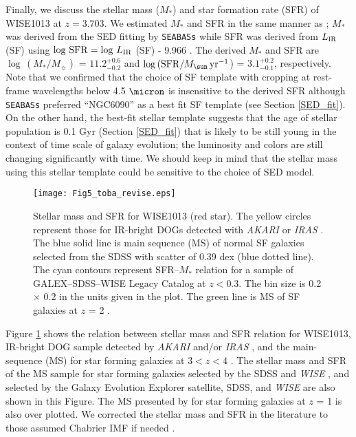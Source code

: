 \documentclass[twocolumn]{aastex6}
\begin{document}
Finally, we discuss the stellar mass ($M_*$) and star formation rate (SFR) of WISE1013 at $z = 3.703$.
We estimated $M_*$ and SFR in the same manner as \citep{Toba_17b}; $M_*$ was derived from the SED fitting by {\tt SEABASs} while SFR was derived from $L_{\rm IR}$ (SF) using $\log \,{\rm SFR} = \log \, L_{\rm IR}$ (SF) - 9.966 \citep{Salim}.
The derived $M_*$ and SFR are $\log \,(M_\ast/M_{\sun})$ = $11.2^{+0.6}_{-0.2}$ and $\log \,({\rm SFR}/M_{\sun}\,{\rm yr}^{-1}$) = $3.1^{+0.2}_{-0.1}$, respectively.
Note that we confirmed that the choice of SF template with cropping at rest-frame wavelengths below 4.5 $\micron$ is insensitive to the derived SFR although {\tt SEABASs} preferred ``NGC6090'' as a best fit SF template (see Section \ref{SED_fit}). 
On the other hand, the best-fit stellar template suggests that the age of stellar population is 0.1 Gyr (Section \ref{SED_fit}) that is likely to be still young in the context of time scale of galaxy evolution; the luminosity and colors are still changing significantly with time.
We should keep in mind that the stellar mass using this stellar template could be sensitive to the choice of SED model.

   \begin{figure}
   \centering
   \texttt{[image: Fig5\_toba\_revise.eps]}
   \caption{Stellar mass and SFR for WISE1013 (red star). The yellow circles represent those for IR-bright DOGs detected with {\it AKARI} or {\it IRAS} \citep{Toba_17b}. The blue solid line is main sequence (MS) of normal SF galaxies selected from the SDSS \citep{Chang} with scatter of 0.39 dex (blue dotted line). The cyan contours represent SFR--$M_*$ relation for a sample of GALEX--SDSS--WISE Legacy Catalog \citep[GSWLC: ][]{Salim} at $z < 0.3$. The bin size is 0.2 $\times$ 0.2 in the units given in the plot. The green line is MS of SF galaxies at $z$ = 2 \citep{Daddi}.}
   \label{M_SFR_fig}
   \end{figure}


Figure \ref{M_SFR_fig} shows the relation between stellar mass and SFR relation for WISE1013, IR-bright DOG sample detected by {\it AKARI} and/or {\it IRAS} \citep{Toba_17b}, and the main-sequence (MS)  for star forming galaxies at $3 < z < 4$ \citep{Tomczak}.
The stellar mass and SFR of the MS sample for star forming galaxies selected by the SDSS and {\it WISE} \citep{Chang}, and selected by the Galaxy Evolution Explorer \citep[{\it GALEX}:][]{Martin} satellite, SDSS, and {\it WISE} \citep{Salim} are also shown in this Figure. 
The MS presented by \cite{Daddi} for star forming galaxies at $z$ = 1 is also over plotted.
We corrected the stellar mass and SFR in the literature to those assumed Chabrier IMF if needed \citep[see][]{Toba_17b}.
\end{document}
